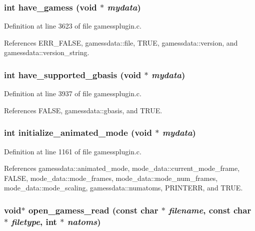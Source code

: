 \subsubsection{\setlength{\rightskip}{0pt plus 5cm}int have\_\-gamess (void $\ast$ {\em mydata})\hspace{0.3cm}{\tt  [static]}}\label{gamessplugin_8c_a32}




Definition at line 3623 of file gamessplugin.c.

References ERR\_\-FALSE, gamessdata::file, TRUE, gamessdata::version, and gamessdata::version\_\-string.
\subsubsection{\setlength{\rightskip}{0pt plus 5cm}int have\_\-supported\_\-gbasis (void $\ast$ {\em mydata})\hspace{0.3cm}{\tt  [static]}}\label{gamessplugin_8c_a35}




Definition at line 3937 of file gamessplugin.c.

References FALSE, gamessdata::gbasis, and TRUE.
\subsubsection{\setlength{\rightskip}{0pt plus 5cm}int initialize\_\-animated\_\-mode (void $\ast$ {\em mydata})}\label{gamessplugin_8c_a16}




Definition at line 1161 of file gamessplugin.c.

References gamessdata::animated\_\-mode, mode\_\-data::current\_\-mode\_\-frame, FALSE, mode\_\-data::mode\_\-frames, mode\_\-data::mode\_\-num\_\-frames, mode\_\-data::mode\_\-scaling, gamessdata::numatoms, PRINTERR, and TRUE.
\subsubsection{\setlength{\rightskip}{0pt plus 5cm}void$\ast$ open\_\-gamess\_\-read (const char $\ast$ {\em filename}, const char $\ast$ {\em filetype}, int $\ast$ {\em natoms})\hspace{0.3cm}{\tt  [static]}}\label{gamessplugin_8c_a4}




